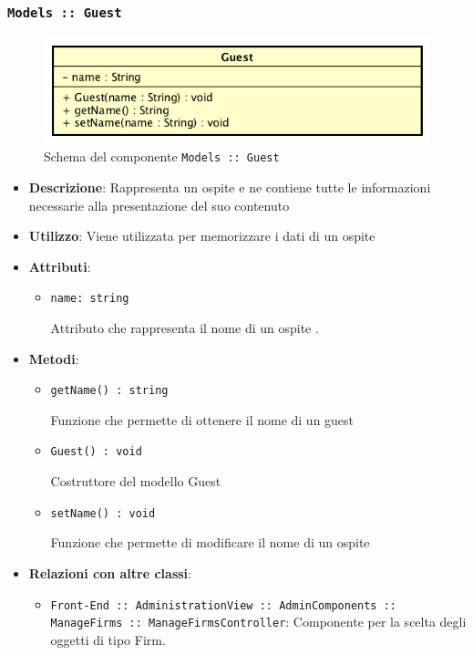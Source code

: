 \documentclass[../DefinizioneDiProdotto.tex]{subfiles}
\begin{document}
\begin{itemize}
\begin{itemize}
	\end{itemize}

	\newpage
	\subsubsection{\texttt{Models :: Guest}}
	\begin{figure}[!h]
		\centering
		\includegraphics[scale=0.7]{Architettura/Models/Guest.png}
		\caption{Schema del componente \texttt{Models :: Guest}}
	\end{figure}
	\begin{itemize}\item \textbf{Descrizione}: Rappresenta un ospite e ne contiene tutte le informazioni necessarie alla presentazione del suo contenuto
	\item \textbf{Utilizzo}: Viene utilizzata per memorizzare i dati di un ospite
	\item \textbf{Attributi}:
	\begin{itemize}
	\item \texttt{name: string}\

	 Attributo che rappresenta il nome di un ospite
	.
	\end{itemize}
	\item \textbf{Metodi}:
	\begin{itemize}
	\item \texttt{getName() : string}\

	 Funzione che permette di ottenere il nome di un guest
	\end{itemize}\vspace{0.5em}
	\begin{itemize}
	\item \texttt{Guest() : void}\

	 Costruttore del modello Guest
	\end{itemize}\vspace{0.5em}
	\begin{itemize}
	\item \texttt{setName() : void}\

	 Funzione che permette di modificare il nome di un ospite
	\end{itemize}\vspace{0.5em}
	\item \textbf{Relazioni con altre classi}:
	\begin{itemize}
	\item \texttt{Front-End :: AdministrationView :: AdminComponents :: ManageFirms :: ManageFirmsController}: Componente per la scelta degli oggetti di tipo Firm.
	\end{itemize}
	\end{itemize}


\end{itemize}
\end{document}
